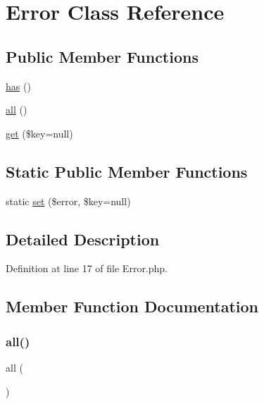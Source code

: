 \hypertarget{class_zest_1_1_auth_1_1_error}{}\section{Error Class Reference}
\label{class_zest_1_1_auth_1_1_error}
\subsection*{Public Member Functions}
\begin{DoxyCompactItemize}
\item 
\mbox{\hyperlink{class_zest_1_1_auth_1_1_error_a9db60e5b2881ca151b1780e9a4e08560}{has}} ()
\item 
\mbox{\hyperlink{class_zest_1_1_auth_1_1_error_af9d14e4ae6227970ad603987781573ca}{all}} ()
\item 
\mbox{\hyperlink{class_zest_1_1_auth_1_1_error_a35cbcd6b22933128eaaa6ded4e8d9aef}{get}} (\$key=null)
\end{DoxyCompactItemize}
\subsection*{Static Public Member Functions}
\begin{DoxyCompactItemize}
\item 
static \mbox{\hyperlink{class_zest_1_1_auth_1_1_error_af8908a25550c971e719a2243b130d80b}{set}} (\$error, \$key=null)
\end{DoxyCompactItemize}


\subsection{Detailed Description}


Definition at line 17 of file Error.\+php.



\subsection{Member Function Documentation}
\mbox{\label{class_zest_1_1_auth_1_1_error_af9d14e4ae6227970ad603987781573ca}} 
\subsubsection{\texorpdfstring{all()}{all()}}
{\footnotesize\ttfamily all (\begin{DoxyParamCaption}{ }\end{DoxyParamCaption})}

